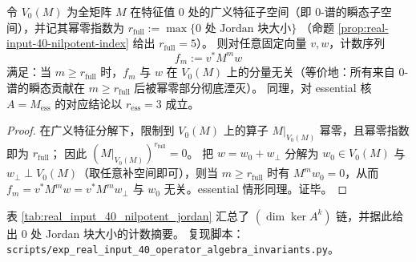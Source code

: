 \begin{corollary}\label{cor:real-input-40-nilpotent-memory-depth}
令 \(V_0(M)\) 为全矩阵 \(M\) 在特征值 \(0\) 处的广义特征子空间（即 \(0\)-谱的瞬态子空间），并记其幂零指数为
\(
r_{\mathrm{full}}:=\max\{\text{$0$ 处 Jordan 块大小}\}
\)
（命题 \ref{prop:real-input-40-nilpotent-index} 给出 \(r_{\mathrm{full}}=5\)）。
则对任意固定向量 \(v,w\)，计数序列
\[
f_m:=v^\ast M^m w
\]
满足：当 \(m\ge r_{\mathrm{full}}\) 时，\(f_m\) 与 \(w\) 在 \(V_0(M)\) 上的分量无关（等价地：所有来自 \(0\)-谱的瞬态贡献在 \(m\ge r_{\mathrm{full}}\) 后被幂零部分彻底湮灭）。
同理，对 essential 核 \(A=M_{\mathrm{ess}}\) 的对应结论以 \(r_{\mathrm{ess}}=3\) 成立。
\end{corollary}

\begin{proof}
在广义特征分解下，限制到 \(V_0(M)\) 上的算子 \(M|_{V_0(M)}\) 幂零，且幂零指数即为 \(r_{\mathrm{full}}\)；
因此 \((M|_{V_0(M)})^{r_{\mathrm{full}}}=0\)。
把 \(w=w_0+w_\perp\) 分解为 \(w_0\in V_0(M)\) 与 \(w_\perp\perp V_0(M)\)（取任意补空间即可），则当 \(m\ge r_{\mathrm{full}}\) 时有 \(M^m w_0=0\)，从而
\(
f_m=v^\ast M^m w=v^\ast M^m w_\perp
\)
与 \(w_0\) 无关。essential 情形同理。证毕。
\end{proof}

\begin{remark}\label{rem:real-input-40-nilpotent-index-repro}
表 \ref{tab:real_input_40_nilpotent_jordan} 汇总了 $(\dim\ker A^k)$ 链，并据此给出 $0$ 处 Jordan 块大小的计数摘要。
复现脚本：\texttt{scripts/exp\_real\_input\_40\_operator\_algebra\_invariants.py}。
\end{remark}

